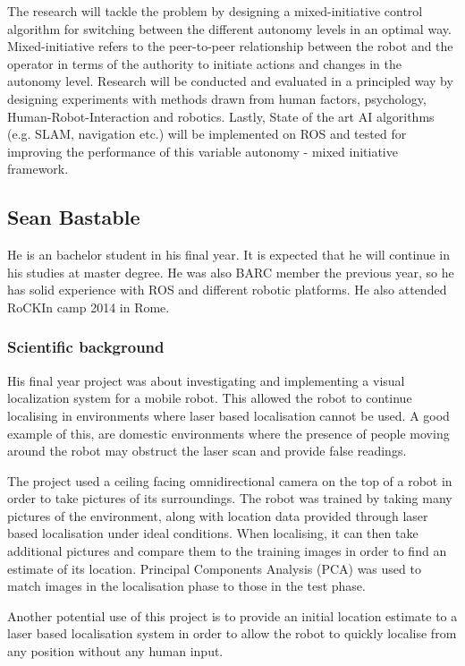 \documentclass[conference]{IEEEtran}
\begin{document}
The research will tackle the problem by designing a mixed-initiative control algorithm for switching between the different autonomy levels in an optimal way. Mixed-initiative refers to the peer-to-peer relationship between the robot and the operator in terms of the authority to initiate actions and changes in the autonomy level. Research will be conducted and evaluated in a principled way by designing experiments with methods drawn from human factors, psychology, Human-Robot-Interaction and robotics. Lastly, State of the art AI algorithms (e.g. SLAM, navigation etc.) will be implemented on ROS and tested for improving the performance of this variable autonomy - mixed initiative framework.

\subsection{Sean Bastable}

He is an bachelor student in his final year. It is expected that he will continue in his studies at master degree. He was also BARC member the previous year, so he has solid experience with ROS and different robotic platforms. He also attended RoCKIn camp 2014 in Rome.

\subsubsection*{Scientific background}
 
His final year project was about investigating and implementing a visual localization system for a mobile robot. This allowed the robot to continue localising in environments where laser based localisation cannot be used. A good example of this, are domestic environments where the presence of people moving around the robot may obstruct the laser scan and provide false readings.
 
The project used a ceiling facing omnidirectional camera on the top of a robot in order to take pictures of its surroundings.
The robot was trained by taking many pictures of the environment, along with location data provided through laser based localisation under ideal conditions. When localising, it can then take additional pictures and compare them to the training images in order to find an estimate of its location. Principal Components Analysis (PCA) was used to match images in the localisation phase to those in the test phase. 

Another potential use of this project is to provide an initial location estimate to a laser based localisation system in order to allow the robot to quickly localise from any position without any human input.
\end{document}

